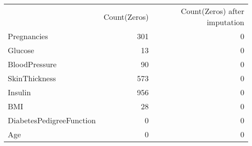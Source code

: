 \begin{tabular}{lrr}
 & Count(Zeros) & Count(Zeros) after imputation \\
Pregnancies & 301 & 0 \\
Glucose & 13 & 0 \\
BloodPressure & 90 & 0 \\
SkinThickness & 573 & 0 \\
Insulin & 956 & 0 \\
BMI & 28 & 0 \\
DiabetesPedigreeFunction & 0 & 0 \\
Age & 0 & 0 \\
\end{tabular}
